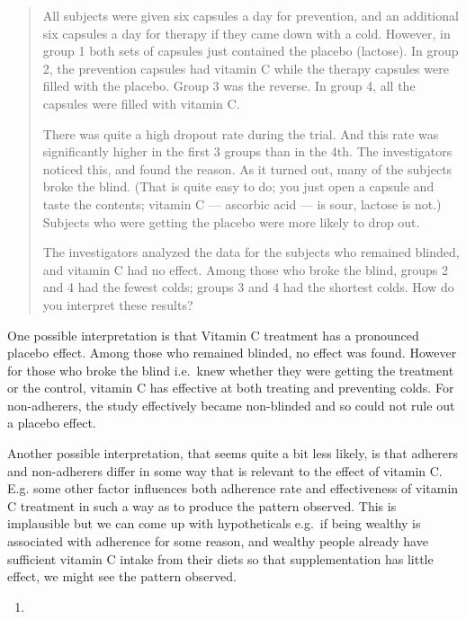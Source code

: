 \documentclass[
]{book}
\providecommand{\tightlist}{%
  \setlength{\itemsep}{0pt}\setlength{\parskip}{0pt}}
\begin{document}
\begin{quote}
All subjects were given six capsules a day for prevention, and an additional six capsules a day for therapy if they came down with a cold. However, in group 1 both sets of capsules just contained the placebo (lactose). In group 2, the prevention capsules had vitamin C while the therapy capsules were filled with the placebo. Group 3 was the reverse. In group 4, all the capsules were filled with vitamin C.

There was quite a high dropout rate during the trial. And this rate was significantly higher in the first 3 groups than in the 4th. The investigators noticed this, and found the reason. As it turned out, many of the subjects broke the blind. (That is quite easy to do; you just open a capsule and taste the contents; vitamin C --- ascorbic acid --- is sour, lactose is not.) Subjects who were getting the placebo were more likely to drop out.

The investigators analyzed the data for the subjects who remained blinded, and vitamin C had no effect. Among those who broke the blind, groups 2 and 4 had the fewest colds; groups 3 and 4 had the shortest colds. How do you interpret these results?
\end{quote}

One possible interpretation is that Vitamin C treatment has a pronounced placebo effect. Among those who remained blinded, no effect was found. However for those who broke the blind i.e.~knew whether they were getting the treatment or the control, vitamin C has effective at both treating and preventing colds. For non-adherers, the study effectively became non-blinded and so could not rule out a placebo effect.

Another possible interpretation, that seems quite a bit less likely, is that adherers and non-adherers differ in some way that is relevant to the effect of vitamin C. E.g. some other factor influences both adherence rate and effectiveness of vitamin C treatment in such a way as to produce the pattern observed.
This is implausible but we can come up with hypotheticals e.g.~if being wealthy is associated with adherence for some reason, and wealthy people already have sufficient vitamin C intake from their diets so that supplementation has little effect, we might see the pattern observed.

\begin{enumerate}
\def\labelenumi{\arabic{enumi}.}
\setcounter{enumi}{5}
\tightlist
\item
\end{enumerate}
\end{document}
